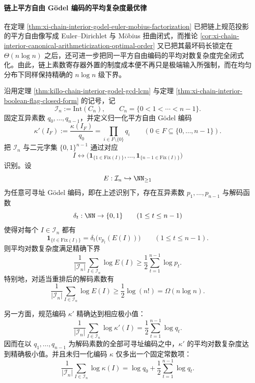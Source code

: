 \paragraph{链上平方自由 Gödel 编码的平均复杂度最优律}
在定理 \ref{thm:xi-chain-interior-godel-euler-mobius-factorization} 已把链上规范投影的平方自由像写成 Euler--Dirichlet 与 Möbius 扭曲闭式，而推论 \ref{cor:xi-chain-interior-canonical-arithmeticization-optimal-order} 又已把其最坏码长锁定在 \(\Theta(n\log n)\) 之后，还可进一步把同一平方自由编码的平均对数复杂度完全闭式化。由此，链上素数寄存器外置的制度成本便不再只是极端输入所强制，而在均匀分布下同样保持精确的 \(n\log n\) 级下界。

\begin{theorem}\label{thm:xi-chain-interior-godel-average-budget-optimality}
沿用定理 \ref{thm:killo-chain-interior-godel-gcd-lcm} 与定理 \ref{thm:xi-chain-interior-boolean-flag-closed-form} 的记号，记
\[
\mathcal I_n:=\mathrm{Int}(C_n),
\qquad
C_n=\{0<1<\cdots<n-1\}.
\]
固定互异素数 \(q_0,\dots,q_{n-1}\)，并定义归一化平方自由 Gödel 编码
\[
\kappa'(I_F):=\frac{\kappa(I_F)}{q_0}
=
\prod_{i\in F\setminus\{0\}}q_i
\qquad
(0\in F\subseteq\{0,\dots,n-1\}).
\]
把 \(\mathcal I_n\) 与二元字集 \(\{0,1\}^{n-1}\) 通过对应
\[
I\longleftrightarrow
\bigl(\mathbf 1_{\{1\in \mathrm{Fix}(I)\}},\dots,\mathbf 1_{\{n-1\in \mathrm{Fix}(I)\}}\bigr)
\]
识别。设
\[
E:\mathcal I_n\hookrightarrow \NN_{\ge 1}
\]
为任意可寻址 Gödel 编码，即在上述识别下，存在互异素数 \(p_1,\dots,p_{n-1}\) 与解码函数
\[
\delta_t:\NN\to\{0,1\}
\qquad(1\le t\le n-1)
\]
使得对每个 \(I\in\mathcal I_n\) 都有
\[
\mathbf 1_{\{t\in\mathrm{Fix}(I)\}}
=
\delta_t\!\bigl(v_{p_t}(E(I))\bigr)
\qquad(1\le t\le n-1).
\]
则平均对数复杂度满足精确下界
\[
\frac{1}{|\mathcal I_n|}
\sum_{I\in\mathcal I_n}\log E(I)
\ge
\frac12\sum_{t=1}^{n-1}\log p_t.
\]
特别地，对适当重排后的解码素数有
\[
\frac{1}{|\mathcal I_n|}
\sum_{I\in\mathcal I_n}\log E(I)
\ge
\frac12\log(n!)
=
\Omega(n\log n).
\]

另一方面，规范编码 \(\kappa'\) 精确达到相应极小值：
\[
\frac{1}{|\mathcal I_n|}
\sum_{I\in\mathcal I_n}\log \kappa'(I)
=
\frac12\sum_{t=1}^{n-1}\log q_t.
\]
因而在以 \(q_1,\dots,q_{n-1}\) 为解码素数的全部可寻址编码之中，\(\kappa'\) 的平均对数复杂度达到精确极小值。并且未归一化编码 \(\kappa\) 仅多出一个固定常数项：
\[
\frac{1}{|\mathcal I_n|}
\sum_{I\in\mathcal I_n}\log \kappa(I)
=
\log q_0+\frac12\sum_{t=1}^{n-1}\log q_t.
\]
\end{theorem}
